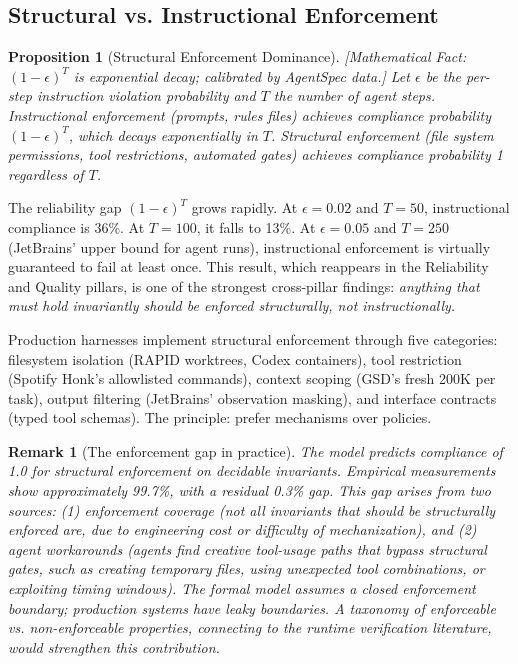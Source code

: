 \documentclass[11pt, a4paper, logo, copyright]{googledeepmind}
\newtheorem{proposition}{Proposition}[section]
\newtheorem*{remark}{Remark}
\begin{document}
\subsection{Structural vs. Instructional Enforcement}

\begin{proposition}[Structural Enforcement Dominance]
\emph{[Mathematical Fact: $(1-\epsilon)^T$ is exponential decay; calibrated by AgentSpec data.]}
\label{prop:enforcement}
Let $\epsilon$ be the per-step instruction violation probability and $T$ the number of agent steps. Instructional enforcement (prompts, rules files) achieves compliance probability $(1-\epsilon)^T$, which decays exponentially in $T$. Structural enforcement (file system permissions, tool restrictions, automated gates) achieves compliance probability 1 regardless of $T$.
\end{proposition}

The reliability gap $(1-\epsilon)^T$ grows rapidly. At $\epsilon = 0.02$ and $T = 50$, instructional compliance is 36\%. At $T = 100$, it falls to 13\%. At $\epsilon = 0.05$ and $T = 250$ (JetBrains' upper bound for agent runs), instructional enforcement is virtually guaranteed to fail at least once. This result, which reappears in the Reliability and Quality pillars, is one of the strongest cross-pillar findings: \emph{anything that must hold invariantly should be enforced structurally, not instructionally.}

Production harnesses implement structural enforcement through five categories: filesystem isolation (RAPID worktrees, Codex containers), tool restriction (Spotify Honk's allowlisted commands), context scoping (GSD's fresh 200K per task), output filtering (JetBrains' observation masking), and interface contracts (typed tool schemas). The principle: prefer mechanisms over policies.

\begin{remark}[The enforcement gap in practice]
The model predicts compliance of 1.0 for structural enforcement on decidable invariants. Empirical measurements show approximately 99.7\%, with a residual 0.3\% gap. This gap arises from two sources: (1) enforcement coverage (not all invariants that should be structurally enforced are, due to engineering cost or difficulty of mechanization), and (2) agent workarounds (agents find creative tool-usage paths that bypass structural gates, such as creating temporary files, using unexpected tool combinations, or exploiting timing windows). The formal model assumes a closed enforcement boundary; production systems have leaky boundaries. A taxonomy of enforceable vs. non-enforceable properties, connecting to the runtime verification literature, would strengthen this contribution.
\end{remark}
\end{document}
